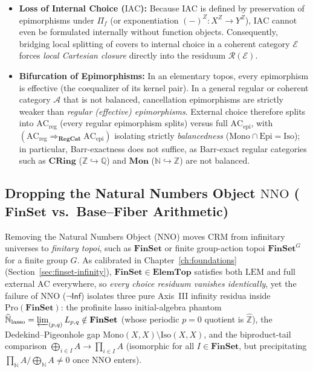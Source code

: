 \begin{itemize}

  \item \textbf{Loss of Internal Choice ($\mathrm{IAC}$):} Because $\mathrm{IAC}$ is defined by preservation of epimorphisms under $\Pi_f$ (or exponentiation $(-)^Z : X^Z \to Y^Z$), $\mathrm{IAC}$ cannot even be formulated internally without function objects. Consequently, bridging local splitting of covers to internal choice in a coherent category $\mathcal{E}$ forces \emph{local Cartesian closure} directly into the residuum $\mathcal{R}(\mathcal{E})$.

  \item \textbf{Bifurcation of Epimorphisms:} In an elementary topos, every epimorphism is effective (the coequalizer of its kernel pair). In a general regular or coherent category $\mathcal{A}$ that is not balanced, cancellation epimorphisms are strictly weaker than \emph{regular (effective) epimorphisms}. External choice therefore splits into $\mathrm{AC}_{\mathrm{reg}}$ (every regular epimorphism splits) versus full $\mathrm{AC}_{\mathrm{epi}}$, with $(\mathrm{AC}_{\mathrm{reg}} \Rightarrow_{\mathbf{RegCat}} \mathrm{AC}_{\mathrm{epi}})$ isolating strictly \emph{balancedness} ($\mathrm{Mono} \cap \mathrm{Epi} = \mathrm{Iso}$); in particular, Barr-exactness does not suffice, as Barr-exact regular categories such as $\mathbf{CRing}$ ($\mathbb{Z} \hookrightarrow \mathbb{Q}$) and $\mathbf{Mon}$ ($\mathbb{N} \hookrightarrow \mathbb{Z}$) are not balanced.

\end{itemize}

\subsection{Dropping the Natural Numbers Object $\mathrm{NNO}$ ($\mathbf{FinSet}$ vs.\ Base--Fiber Arithmetic)}

Removing the Natural Numbers Object ($\mathrm{NNO}$) moves $\mathrm{CRM}$ from infinitary universes to \emph{finitary topoi}, such as $\mathbf{FinSet}$ or finite group-action topoi $\mathbf{FinSet}^G$ for a finite group $G$. As calibrated in Chapter~\ref{ch:foundations} (Section~\ref{sec:finset-infinity}), $\mathbf{FinSet} \in \mathbf{ElemTop}$ satisfies both $\mathrm{LEM}$ and full external $\mathrm{AC}$ everywhere, so \emph{every choice residuum vanishes identically}, yet the failure of $\mathrm{NNO}$ ($\neg\mathsf{Inf}$) isolates three pure Axis~III infinity residua inside $\mathrm{Pro}(\mathbf{FinSet})$: the profinite lasso initial-algebra phantom $\widehat{\mathbb{N}}_{\mathrm{lasso}} = \varprojlim_{(p,q)} L_{p,q} \notin \mathbf{FinSet}$ (whose periodic $p=0$ quotient is $\widehat{\mathbb{Z}}$), the Dedekind--Pigeonhole gap $\mathrm{Mono}(X,X)\setminus\mathrm{Iso}(X,X)$, and the biproduct-tail comparison $\bigoplus_{i \in I} A \to \prod_{i \in I} A$ (isomorphic for all $I \in \mathbf{FinSet}$, but precipitating $\prod_{\mathbb{N}} A / \bigoplus_{\mathbb{N}} A \neq 0$ once $\mathrm{NNO}$ enters).

